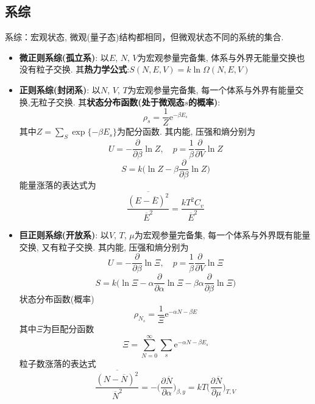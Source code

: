 \subsection{系综}
系综：宏观状态, 微观(量子态)结构都相同，但微观状态不同的系统的集合.
\begin{itemize}
\item\textbf{微正则系综(孤立系)}: 以$E$, $N$, $V$为宏观参量完备集, 体系与外界无能量交换也没有粒子交换. 其\textbf{热力学公式}:$S(N,E,V) = k\ln\Omega(N,E,V)$
\item\textbf{正则系综(封闭系)}: 以$N$, $V$, $T$为宏观参量完备集, 每一个体系与外界有能量交换,无粒子交换. 其\textbf{状态分布函数(处于微观态$s$的概率)}:
\[
\rho_s=\frac{1}{Z}\mathrm{e}^{-\beta E_s}
\]
其中$Z=\sum_S \exp\{-\beta E_s\}$为配分函数. 其内能, 压强和熵分别为
\[
U = -\frac{\partial}{\partial\beta}\ln Z,\quad
p = \frac{1}{\beta}\frac{\partial}{\partial V}\ln Z
\]
\[
S = k\bigg(\ln Z - \beta\frac{\partial}{\partial\beta}\ln Z \bigg)
\]
能量涨落的表达式为
\[
\frac{\overline{(E-\overline{E})^2}}{\overline{E}^2}=\frac{kT^2C_v}{\overline{E}^2}
\]
\item\textbf{巨正则系综(开放系)}: 以$V$, $T$, $\mu$为宏观参量完备集, 每一个体系与外界既有能量交换, 又有粒子交换. 其内能, 压强和熵分别为
\[
U = -\frac{\partial}{\partial\beta}\ln \Xi,\quad
p = \frac{1}{\beta}\frac{\partial}{\partial V}\ln \Xi
\]
\[
S = k\bigg(\ln \Xi - \alpha\frac{\partial}{\partial\alpha}\ln \Xi - \beta\alpha\frac{\partial}{\partial\beta}\ln \Xi \bigg)
\]
状态分布函数(概率)
\[
\rho_{N_s} = \frac{1}{\Xi} \mathrm{e}^{-\alpha N-\beta E}
\]
其中$\Xi$为巨配分函数
\[
\Xi = \sum_{N=0}^\infty\sum_s \mathrm{e}^{-\alpha N-\beta E_s}
\]
粒子数涨落的表达式
\[
\frac{\overline{(N-\overline{N})^2}}{\overline{N}^2} 
= -\bigg(\frac{\partial \overline{N}}{\partial\alpha}\bigg)_{\beta,y} 
= kT\bigg(\frac{\partial \overline{N}}{\partial\mu}\bigg)_{T,V} 
\]

\end{itemize}



